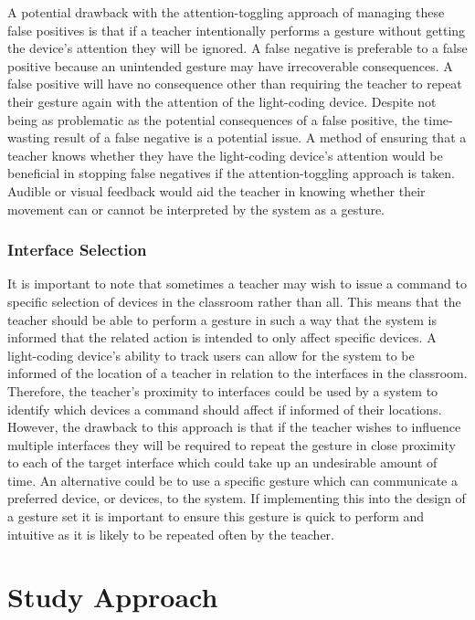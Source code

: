 \documentclass[link]{IWCOMP}
\begin{document}
A potential drawback with the attention-toggling approach of managing these false positives is that if a teacher intentionally performs a gesture without getting the device's attention they will be ignored.
A false negative is preferable to a false positive because an unintended gesture may have irrecoverable consequences.
A false positive will have no consequence other than requiring the teacher to repeat their gesture again with the attention of the light-coding device.
Despite not being as problematic as the potential consequences of a false positive, the time-wasting result of a false negative is a potential issue.
A method of ensuring that a teacher knows whether they have the light-coding device's attention would be beneficial in stopping false negatives if the attention-toggling approach is taken.
Audible or visual feedback would aid the teacher in knowing whether their movement can or cannot be interpreted by the system as a gesture.

\subsubsection{Interface Selection}  
\label{subsubsec:interfaceSelection}

It is important to note that sometimes a teacher may wish to issue a command to specific selection of devices in the classroom rather than all.
This means that the teacher should be able to perform a gesture in such a way that the system is informed that the related action is intended to only affect specific devices.
A light-coding device's ability to track users can allow for the system to be informed of the location of a teacher in relation to the interfaces in the classroom.
Therefore, the teacher's proximity to interfaces could be used by a system to identify which devices a command should affect if informed of their locations.
However, the drawback to this approach is that if the teacher wishes to influence multiple interfaces they will be required to repeat the gesture in close proximity to each of the target interface which could take up an undesirable amount of time.
An alternative could be to use a specific gesture which can communicate a preferred device, or devices, to the system.
If implementing this into the design of a gesture set it is important to ensure this gesture is quick to perform and intuitive as it is likely to be repeated often by the teacher.

\section{Study Approach} 
\label{sec:studyApproach}
\end{document}
